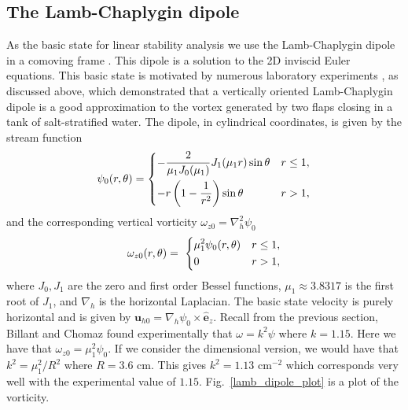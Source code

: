 \subsection{The Lamb-Chaplygin dipole} 
As the basic state for linear stability analysis we use the Lamb-Chaplygin dipole in a comoving frame \cite{meleshko1994}. This dipole is a solution to the 2D inviscid Euler equations. This basic state is motivated by numerous laboratory experiments \cite{bc2000a,leweke1998}, as discussed above, which demonstrated that a vertically oriented Lamb-Chaplygin dipole is a good approximation to the vortex generated by two flaps closing in a tank of salt-stratified water. The dipole, in cylindrical coordinates, is given by the stream function
\begin{align}
\psi_{0}(r,\theta) = 
\begin{dcases}
-\frac{2}{\mu_{1}J_{0}(\mu_{1})}J_{1}(\mu_{1}r)\sin\theta & r\le 1,\\\label{lc_dipole_sf}
-r\left(1-\frac{1}{r^{2}}\right)\sin\theta & r>1 ,
\end{dcases}
\end{align}
and the corresponding vertical vorticity $\omega_{z0}=\nabla_{h}^{2}\psi_{0}$
\begin{align}
\omega_{z0}(r,\theta) = \
\begin{dcases}
\mu_{1}^{2}\psi_{0}(r,\theta) & r\le 1,\\
0 & r>1,
\end{dcases}
\end{align}
where $J_{0},J_{1}$ are the zero and first order Bessel functions, $\mu_{1}\approx 3.8317$ is the first root of $J_{1}$, and $\nabla_{h}$ is the horizontal Laplacian. The basic state velocity is purely horizontal and is given by $\bm{u}_{h0}=\nabla_{h}\psi_{0}\times\hat{\bm{e}}_{z}$. Recall from the previous section, Billant and Chomaz found experimentally that $\omega = k^{2}\psi$ where $k=1.15$. Here we have that $\omega_{z0}=\mu_{1}^{2}\psi_{0}$. If we consider the dimensional version, we would have that $k^{2} = \mu_{1}^{2}/R^{2}$ where $R=3.6$ cm. This gives $k^{2} = 1.13 \text{ cm}^{-2}$ which corresponds very well with the experimental value of $1.15$. Fig.~\ref{lamb_dipole_plot} is a plot of the vorticity. 

